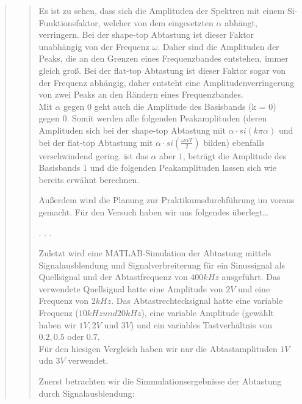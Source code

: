 \begin{quote}
\begin{quote}
		Es ist zu sehen, dass sich die Amplituden der Spektren mit einem
		Si-Funktionsfaktor, welcher von dem eingesetzten $\alpha$ abhängt, verringern.
		Bei der shape-top Abtastung ist dieser Faktor unabhängig von der Frequenz
		$\omega$. Daher sind die Amplituden der Peaks, die an den Grenzen eines
		Frequenzbandes entstehen, immer gleich groß.    	
		Bei der flat-top Abtastung ist dieser Faktor sogar von der Frequenz abhängig, daher entsteht 
		eine Amplitudenverringerung von zwei Peaks an den Rändern eines
		Frequenzbandes.\\
		Mit $\alpha$ gegen $0$ geht auch die Amplitude des Basisbands (k = $0$) gegen
		$0$. Somit werden alle folgenden Peakamplituden (deren Amplituden sich bei der
		shape-top Abtastung mit $\alpha \cdot si(k \pi \alpha)$ und bei der flat-top
		Abtastung mit $\alpha \cdot si(\frac{\omega \alpha T}{2})$ bilden) ebenfalls
		verschwindend gering. ist das $\alpha$ aber $1$, beträgt die Amplitude des
		Basisbands $1$ und die folgenden Peakamplituden lassen sich wie bereits
		erwähnt berechnen.
    	
    	
    	Außerdem wird die Planung zur Praktikumsdurchführung im voraus gemacht. Für
    	den Versuch haben wir uns folgendes überlegt\ldots
    	
    	.
    	.
    	.
    	
    	Zuletzt wird eine MATLAB-Simulation der Abtastung mittels Signalausblendung
    	und Signalverbreiterung für ein Sinussignal als Quellsignal und der
    	Abtastfrequenz von $400 kHz$ ausgeführt. Das verwendete Quellsignal
    	hatte eine Amplitude von $2V$ und eine Frequenz von $2 kHz$. Das
    	Abtastrechtecksignal hatte eine variable Frequenz ($10 kHz und 20 kHz$),
    	eine variable Amplitude (gewählt haben wir $1V, 2V$ und $3V$) und ein
    	variables Tastverhältnis von $0.2, 0.5$ oder $0.7$.\\
    	Für den hiesigen Vergleich haben wir nur die Abtastamplituden $1V$ udn $3V$
    	verwendet.
    	
    	Zuerst betrachten wir die Simmulationsergebnisse der Abtastung durch
    	Signalausblendung:
    	

\end{quote}
\end{quote}

